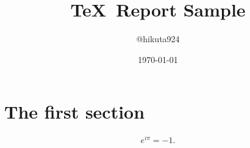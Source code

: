 
\title{\TeX\ Report Sample}
\author{@hikuta924}
\date{\today}

\maketitle

\section{The first section}
\begin{equation}
	e^{i \pi} = -1.
\end{equation}



\cite{Sam2014}



